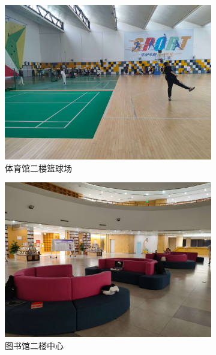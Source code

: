 \begin{figure}[H]
    \centering
    \begin{subfigure}[htb]{0.48\textwidth}
        \centering
        \includegraphics[width=\textwidth]{figures/Monitoring_point_-_basketball_court_on_the_second_floor_of_the_gymnasium.jpg}
        \caption{体育馆二楼篮球场}
    \end{subfigure}
    \hfill
    \begin{subfigure}[htb]{0.48\textwidth}
        \centering
        \includegraphics[width=\textwidth]{figures/Monitoring_point_-_center_on_the_second_floor_of_the_library.jpg}
        \caption{图书馆二楼中心}
    \end{subfigure}
    \hfill
    \begin{subfigure}[htb]{0.48\textwidth}

\end{subfigure}
\end{figure}
